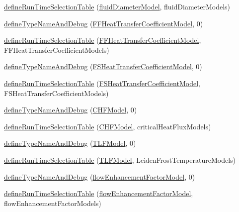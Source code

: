 \begin{DoxyCompactItemize}
\item 
\hyperlink{namespaceFoam_a41d1a55c9067d595419a0cb8607b3781}{define\+Run\+Time\+Selection\+Table} (\hyperlink{classFoam_1_1fluidDiameterModel}{fluid\+Diameter\+Model}, fluid\+Diameter\+Models)
\item 
\hyperlink{namespaceFoam_ae5cf1081ab7bf5f0780b45006b7b7908}{define\+Type\+Name\+And\+Debug} (\hyperlink{classFoam_1_1FFHeatTransferCoefficientModel}{F\+F\+Heat\+Transfer\+Coefficient\+Model}, 0)
\item 
\hyperlink{namespaceFoam_a749d9f2ff532788245f8a6c93aa3bc6c}{define\+Run\+Time\+Selection\+Table} (\hyperlink{classFoam_1_1FFHeatTransferCoefficientModel}{F\+F\+Heat\+Transfer\+Coefficient\+Model}, F\+F\+Heat\+Transfer\+Coefficient\+Models)
\item 
\hyperlink{namespaceFoam_a5a1a46642f703b6eb41c4849cb09bf05}{define\+Type\+Name\+And\+Debug} (\hyperlink{classFoam_1_1FSHeatTransferCoefficientModel}{F\+S\+Heat\+Transfer\+Coefficient\+Model}, 0)
\item 
\hyperlink{namespaceFoam_adf596c7bfcd7d200cd4a93663f5f4529}{define\+Run\+Time\+Selection\+Table} (\hyperlink{classFoam_1_1FSHeatTransferCoefficientModel}{F\+S\+Heat\+Transfer\+Coefficient\+Model}, F\+S\+Heat\+Transfer\+Coefficient\+Models)
\item 
\hyperlink{namespaceFoam_a965eeee336473fdef01a764079f9c67f}{define\+Type\+Name\+And\+Debug} (\hyperlink{classFoam_1_1CHFModel}{C\+H\+F\+Model}, 0)
\item 
\hyperlink{namespaceFoam_a7372fc01e45e28725fa54e51719f27ae}{define\+Run\+Time\+Selection\+Table} (\hyperlink{classFoam_1_1CHFModel}{C\+H\+F\+Model}, critical\+Heat\+Flux\+Models)
\item 
\hyperlink{namespaceFoam_a6d89079e1d5c7f1774161c5a79be8624}{define\+Type\+Name\+And\+Debug} (\hyperlink{classFoam_1_1TLFModel}{T\+L\+F\+Model}, 0)
\item 
\hyperlink{namespaceFoam_a6a0fca32917a71d25d7e45f426af6ccf}{define\+Run\+Time\+Selection\+Table} (\hyperlink{classFoam_1_1TLFModel}{T\+L\+F\+Model}, Leiden\+Frost\+Temperature\+Models)
\item 
\hyperlink{namespaceFoam_ab69ac4e8522889ed51343e4174ec3eb3}{define\+Type\+Name\+And\+Debug} (\hyperlink{classFoam_1_1flowEnhancementFactorModel}{flow\+Enhancement\+Factor\+Model}, 0)
\item 
\hyperlink{namespaceFoam_a7d3aebc2befea51c390edd50228c9fbc}{define\+Run\+Time\+Selection\+Table} (\hyperlink{classFoam_1_1flowEnhancementFactorModel}{flow\+Enhancement\+Factor\+Model}, flow\+Enhancement\+Factor\+Models)

\end{DoxyCompactItemize}
